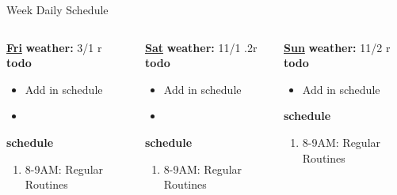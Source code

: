 \begin{multicols}{4}
\begin{columns}
\begin{column}{0.6\linewidth}
\begin{block}{Week Daily Schedule}
\begin{columns}
          \begin{column}{0.14\textwidth}{\small \underline{\bf Fri}}
            {\tiny \bf weather: } {\tiny 3/1 r} \\ 
            {\tiny \bf todo} \\ 
            \begin{itemize}
              \tiny \item \tiny Add in schedule
            \item \tiny 
            \end{itemize} 
                {\tiny \bf schedule} \\
                \begin{enumerate} 
                  \tiny \item \tiny 8-9AM: Regular Routines 
                \end{enumerate}
          \end{column}

          \begin{column}{0.15\textwidth}{\small \underline{\bf Sat}}
            {\tiny \bf weather: } {\tiny 11/1 .2r} \\ 
            { \tiny \bf todo} \\ 
            \begin{itemize}
              \tiny \item \tiny Add in schedule
            \item \tiny 
            \end{itemize} 
                {\tiny \bf schedule} \\
                \begin{enumerate} 
                  \tiny \item \tiny 8-9AM: Regular Routines 
                \end{enumerate}
          \end{column}
         
          \begin{column}{0.15\textwidth}{\small \underline{\bf Sun}}
            {\tiny {\bf weather:} } {\tiny 11/2 r} \\ 
            {\tiny {\bf todo}}\\
            \begin{itemize}
              \tiny \item \tiny Add in schedule
            \end{itemize} 
                {\tiny \bf schedule}\\
                \begin{enumerate} 
                  \tiny \item \tiny 8-9AM: Regular Routines 
                \end{enumerate}
          \end{column}
        \end{columns}
      \end{block}
\end{column}
    

\end{columns}
\end{multicols}
